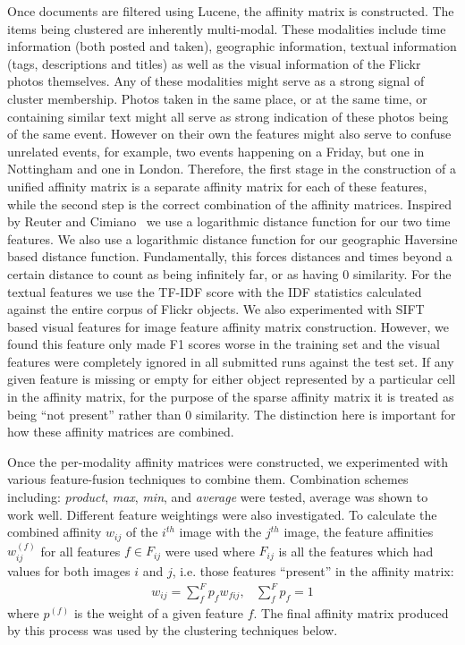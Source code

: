 \documentclass{../acm_proc_article-me11_tweaked}
\begin{document}
Once documents are filtered using Lucene, the affinity matrix is constructed. The items being clustered are inherently multi-modal. These modalities include time information (both posted and taken), geographic information, textual information (tags, descriptions and titles) as well as the visual information of the Flickr photos themselves. Any of these modalities might serve as a strong signal of cluster membership. Photos taken in the same place, or at the same time, or containing similar text might all serve as strong indication of these photos being of the same event. However on their own the features might also serve to confuse unrelated events, for example, two events happening on a Friday, but one in Nottingham and one in London. Therefore, the first stage in the construction of a unified affinity matrix is a separate affinity matrix for each of these features, while the second step is the correct combination of the affinity matrices. Inspired by Reuter and Cimiano~\cite{Reuter2012ECS23247962324824} we use a logarithmic distance function for our two time features. We also use a logarithmic distance function for our geographic Haversine based distance function. Fundamentally, this forces distances and times beyond a certain distance to count as being infinitely far, or as having 0 similarity. For the textual features we use the TF-IDF score with the IDF statistics calculated against the entire corpus of Flickr objects. We also experimented with SIFT based visual features for image feature affinity matrix construction. However, we found this feature only made F1 scores worse in the training set and the visual features were completely ignored in all submitted runs against the test set. If any given feature is missing or empty for either object represented by a particular cell in the affinity matrix, for the purpose of the sparse affinity matrix it is treated as being ``not present'' rather than 0 similarity. The distinction here is important for how these affinity matrices are combined.

Once the per-modality affinity matrices were constructed, we experimented with various feature-fusion techniques to combine them. Combination schemes including: \emph{product}, \emph{max}, \emph{min}, and \emph{average} were tested, average was shown to work well. Different feature weightings were also investigated. To calculate the combined affinity $w_{ij}$ of the $i^{th}$ image with the $j^{th}$ image, the feature affinities $w_{ij}^{(f)}$ for all features $f\in F_{ij}$ were used where $F_{ij}$ is all the features which had values for both images $i$ and $j$, i.e. those features ``present'' in the affinity matrix:
\begin{eqnarray}
 w_{ij} = \sum\limits_{f}^F p_{f} w_{fij},&\sum\limits_{f}^F p_{f} = 1
\end{eqnarray}
where $p^{(f)}$ is the weight of a given feature $f$. The final affinity matrix produced by this process was used by the clustering techniques below.
\end{document}
